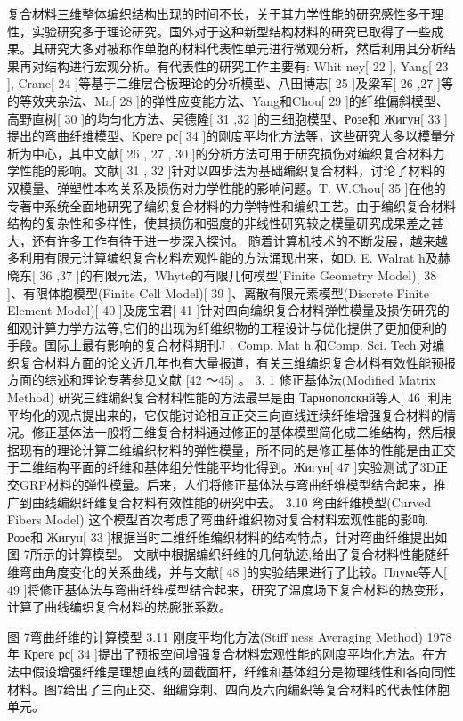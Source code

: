 复合材料三维整体编织结构出现的时间不长，关于其力学性能的研究感性多于理性，实验研究多于理论研究。国外对于这种新型结构材料的研究已取得了一些成果。其研究大多对被称作单胞的材料代表性单元进行微观分析，然后利用其分析结果再对结构进行宏观分析。有代表性的研究工作主要有: Whit ney[ 22 ], Yang[ 23 ], Crane[ 24 ]等基于二维层合板理论的分析模型、八田博志[ 25 ]及梁军[ 26 ,27 ]等的等效夹杂法、Ma[ 28 ]的弹性应变能方法、Yang和Chou[ 29 ]的纤维偏斜模型、高野直树[ 30 ]的均匀化方法、吴德隆[ 31 ,32 ]的三细胞模型、Розе和 Жигун[ 33 ]提出的弯曲纤维模型、Креге рс[ 34 ]的刚度平均化方法等，这些研究大多以模量分析为中心，其中文献[ 26 , 27 , 30 ]的分析方法可用于研究损伤对编织复合材料力学性能的影响。文献[ 31 , 32 ]针对以四步法为基础编织复合材料，讨论了材料的双模量、弹塑性本构关系及损伤对力学性能的影响问题。T. W.Chou[ 35 ]在他的专著中系统全面地研究了编织复合材料的力学特性和编织工艺。由于编织复合材料结构的复杂性和多样性，使其损伤和强度的非线性研究较之模量研究成果差之甚大，还有许多工作有待于进一步深入探讨。
随着计算机技术的不断发展，越来越多利用有限元计算编织复合材料宏观性能的方法涌现出来，如D. E. Walrat h及赫晓东[ 36 ,37 ]的有限元法，Whyte的有限几何模型(Finite Geometry Model)[ 38 ]、有限体胞模型(Finite Cell Model)[ 39 ]、离散有限元素模型(Discrete Finite Element Model)[ 40 ]及庞宝君[ 41 ]针对四向编织复合材料弹性模量及损伤研究的细观计算力学方法等,它们的出现为纤维织物的工程设计与优化提供了更加便利的手段。国际上最有影响的复合材料期刊J . Comp. Mat h.和Comp. Sci.  Tech.对编织复合材料方面的论文近几年也有大量报道，有关三维编织复合材料有效性能预报方面的综述和理论专著参见文献 [42 ～45] 。
3. 1 修正基体法(Modified Matrix Method)
研究三维编织复合材料性能的方法最早是由 Тарнополскнй等人[ 46 ]利用平均化的观点提出来的，它仅能讨论相互正交三向直线连续纤维增强复合材料的情况。修正基体法一般将三维复合材料通过修正的基体模型简化成二维结构，然后根据现有的理论计算二维编织材料的弹性模量，所不同的是修正基体的性能是由正交于二维结构平面的纤维和基体组分性能平均化得到。Жигун[ 47 ]实验测试了3D正交GRP材料的弹性模量。后来，人们将修正基体法与弯曲纤维模型结合起来，推广到曲线编织纤维复合材料有效性能的研究中去。
3.10  弯曲纤维模型(Curved Fibers Model)
这个模型首次考虑了弯曲纤维织物对复合材料宏观性能的影响. Розе和 Жигун[ 33 ]根据当时二维纤维编织材料的结构特点，针对弯曲纤维提出如图 7所示的计算模型。
文献中根据编织纤维的几何轨迹,给出了复合材料性能随纤维弯曲角度变化的关系曲线，并与文献[ 48 ]的实验结果进行了比较。Плуме等人[ 49 ]将修正基体法与弯曲纤维模型结合起来，研究了温度场下复合材料的热变形，计算了曲线编织复合材料的热膨胀系数。
 
图 7弯曲纤维的计算模型
3.11  刚度平均化方法(Stiff ness Averaging Method)
1978年 Креге рс[ 34 ]提出了预报空间增强复合材料宏观性能的刚度平均化方法。在方法中假设增强纤维是理想直线的圆截面杆，纤维和基体组分是物理线性和各向同性材料。图7给出了三向正交、细编穿刺、四向及六向编织等复合材料的代表性体胞单元。
 
